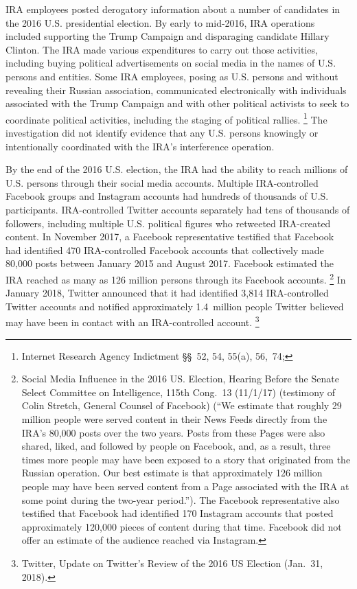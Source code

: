 IRA employees posted derogatory information about a  number of candidates in the 2016 U.S. presidential election.
By early to mid-2016, IRA operations included supporting the Trump Campaign and disparaging candidate Hillary Clinton.
The IRA made various expenditures to carry out those activities, including buying political advertisements on social media in the names of U.S. persons and entities.
Some IRA employees, posing as U.S. persons and without revealing their Russian association, communicated electronically with individuals associated with the Trump Campaign and with other political activists to seek to coordinate political activities, including the staging of political rallies.%
\footnote{Internet Research Agency Indictment \S\S~52, 54, 55(a), 56,~74; }
The investigation did not identify evidence that any U.S. persons knowingly or intentionally coordinated with the IRA's interference operation.

By the end of the 2016 U.S. election, the IRA had the ability to reach millions of U.S. persons through their social media accounts.
Multiple IRA-controlled Facebook groups and Instagram accounts had hundreds of thousands of U.S. participants.
IRA-controlled Twitter accounts separately had tens of thousands of followers, including multiple U.S. political figures who retweeted IRA-created content.
In November 2017, a Facebook representative testified that Facebook had identified 470 IRA-controlled Facebook accounts that collectively made 80,000 posts between January 2015 and August 2017.
Facebook estimated the IRA reached as many as 126 million persons through its Facebook accounts.%
\footnote{Social Media Influence in the 2016 US. Election, Hearing Before the Senate Select Committee on Intelligence, 115th Cong.~13 (11/1/17) (testimony of Colin Stretch, General Counsel of Facebook)
(``We estimate that roughly 29 million people were served content in their News Feeds directly from the IRA's 80,000 posts over the two years.
Posts from these Pages were also shared, liked, and followed by people on Facebook, and, as a result, three times more people may have been exposed to a story that originated from the Russian operation.
Our best estimate is that approximately 126 million people may have been served content from a Page associated with the IRA at some point during the two-year period.'').
The Facebook representative also testified that Facebook had identified 170 Instagram accounts that posted approximately 120,000 pieces of content during that time.
Facebook did not offer an estimate of the audience reached via Instagram.}
In January 2018, Twitter announced that it had identified 3,814 IRA-controlled Twitter accounts and notified approximately 1.4~million people Twitter believed may have been in contact with an IRA-controlled account.%
\footnote{Twitter, Update on Twitter's Review of the 2016 US Election (Jan.~31, 2018).}

